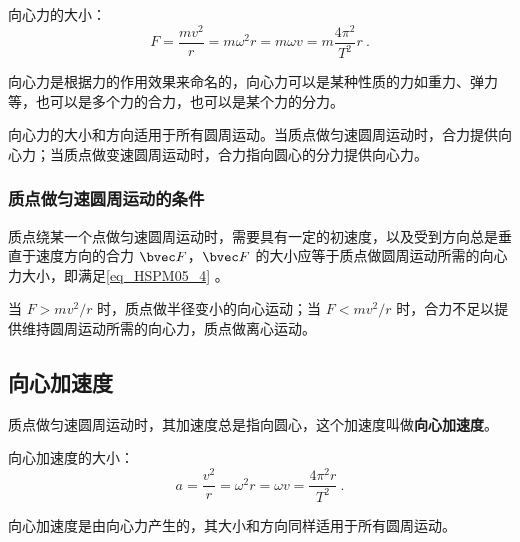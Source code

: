 向心力的大小：
\begin{equation}\label{eq_HSPM05_4}
F=\frac{mv^2}{r}=m\omega^2r=m\omega v=m\frac{4\pi^2}{T^2}r~.
\end{equation}

向心力是根据力的作用效果来命名的，向心力可以是某种性质的力如重力、弹力等，也可以是多个力的合力，也可以是某个力的分力。

向心力的大小和方向适用于所有圆周运动。当质点做匀速圆周运动时，合力提供向心力；当质点做变速圆周运动时，合力指向圆心的分力提供向心力。

\subsubsection{质点做匀速圆周运动的条件}

质点绕某一个点做匀速圆周运动时，需要具有一定的初速度，以及受到方向总是垂直于速度方向的合力 $\bvec F$，$\bvec F$ 的大小应等于质点做圆周运动所需的向心力大小，即满足\autoref{eq_HSPM05_4} 。

当 $F>mv^2/r$ 时，质点做半径变小的向心运动；当 $F<mv^2/r$ 时，合力不足以提供维持圆周运动所需的向心力，质点做离心运动。

\subsection{向心加速度}

质点做匀速圆周运动时，其加速度总是指向圆心，这个加速度叫做\textbf{向心加速度}。

向心加速度的大小：
\begin{equation}
a=\frac{v^2}{r}=\omega^2r=\omega v=\frac{4\pi^2r}{T^2}~.
\end{equation}

向心加速度是由向心力产生的，其大小和方向同样适用于所有圆周运动。

